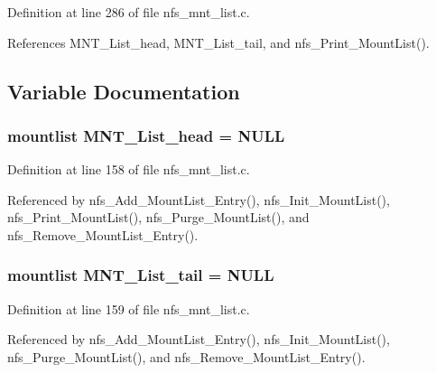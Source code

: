 Definition at line 286 of file nfs\_\-mnt\_\-list.c.

References MNT\_\-List\_\-head, MNT\_\-List\_\-tail, and nfs\_\-Print\_\-Mount\-List().

\subsection{Variable Documentation}
\subsubsection{\setlength{\rightskip}{0pt plus 5cm}mountlist {\bf MNT\_\-List\_\-head} = NULL}\label{nfs__mnt__list_8c_a0}




Definition at line 158 of file nfs\_\-mnt\_\-list.c.

Referenced by nfs\_\-Add\_\-Mount\-List\_\-Entry(), nfs\_\-Init\_\-Mount\-List(), nfs\_\-Print\_\-Mount\-List(), nfs\_\-Purge\_\-Mount\-List(), and nfs\_\-Remove\_\-Mount\-List\_\-Entry().
\subsubsection{\setlength{\rightskip}{0pt plus 5cm}mountlist {\bf MNT\_\-List\_\-tail} = NULL}\label{nfs__mnt__list_8c_a1}




Definition at line 159 of file nfs\_\-mnt\_\-list.c.

Referenced by nfs\_\-Add\_\-Mount\-List\_\-Entry(), nfs\_\-Init\_\-Mount\-List(), nfs\_\-Purge\_\-Mount\-List(), and nfs\_\-Remove\_\-Mount\-List\_\-Entry().